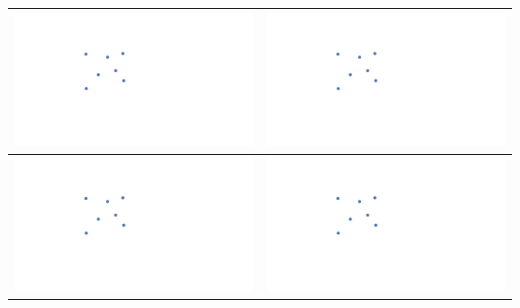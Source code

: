 \documentclass[a4paper,12pt]{article}
\begin{document}
\begin{tabular}{|c|c|}
\hline
\hspace{10pt}\includegraphics[width=0.425\linewidth]{../images/voronoi7.pdf}\hspace{10pt} & \hspace{10pt}\includegraphics[width=0.425\linewidth]{../images/voronoi7.pdf}\hspace{10pt} \\
\hline
\hspace{10pt}\includegraphics[width=0.425\linewidth]{../images/voronoi7.pdf}\hspace{10pt} & \hspace{10pt}\includegraphics[width=0.425\linewidth]{../images/voronoi7.pdf}\hspace{10pt} \\
\hline
\end{tabular}
\end{document}

